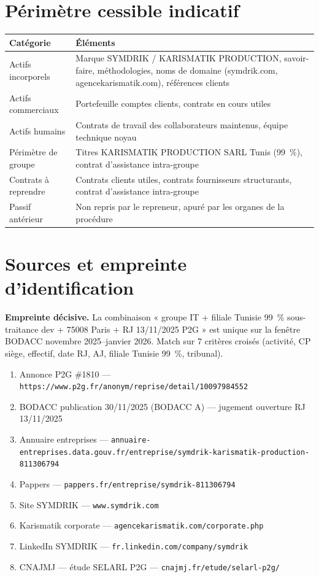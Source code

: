 \documentclass[11pt,a4paper]{article}
\begin{document}
\section{Périmètre cessible indicatif}

\begin{longtable}{L{4.5cm}L{10.5cm}}
\toprule
\textbf{Catégorie} & \textbf{Éléments} \\
\midrule
\endhead
Actifs incorporels & Marque SYMDRIK / KARISMATIK PRODUCTION, savoir-faire, méthodologies, noms de domaine (symdrik.com, agencekarismatik.com), références clients \\
Actifs commerciaux & Portefeuille comptes clients, contrats en cours utiles \\
Actifs humains & Contrats de travail des collaborateurs maintenus, équipe technique noyau \\
Périmètre de groupe & Titres KARISMATIK PRODUCTION SARL Tunis (99~\%), contrat d'assistance intra-groupe \\
Contrats à reprendre & Contrats clients utiles, contrats fournisseurs structurants, contrat d'assistance intra-groupe \\
Passif antérieur & Non repris par le repreneur, apuré par les organes de la procédure \\
\bottomrule
\end{longtable}

\section{Sources et empreinte d'identification}

\textbf{Empreinte décisive.} La combinaison « groupe IT + filiale Tunisie 99~\% sous-traitance dev + 75008 Paris + RJ 13/11/2025 P2G » est unique sur la fenêtre BODACC novembre 2025--janvier 2026. Match sur 7 critères croisés (activité, CP siège, effectif, date RJ, AJ, filiale Tunisie 99~\%, tribunal).

\begin{enumerate}[leftmargin=2em]
\item Annonce P2G \#1810 --- \texttt{https://www.p2g.fr/anonym/reprise/detail/10097984552}
\item BODACC publication 30/11/2025 (BODACC A) --- jugement ouverture RJ 13/11/2025
\item Annuaire entreprises --- \texttt{annuaire-entreprises.data.gouv.fr/entreprise/symdrik-karismatik-production-811306794}
\item Pappers --- \texttt{pappers.fr/entreprise/symdrik-811306794}
\item Site SYMDRIK --- \texttt{www.symdrik.com}
\item Karismatik corporate --- \texttt{agencekarismatik.com/corporate.php}
\item LinkedIn SYMDRIK --- \texttt{fr.linkedin.com/company/symdrik}
\item CNAJMJ --- étude SELARL P2G --- \texttt{cnajmj.fr/etude/selarl-p2g/}
\end{enumerate}
\end{document}
